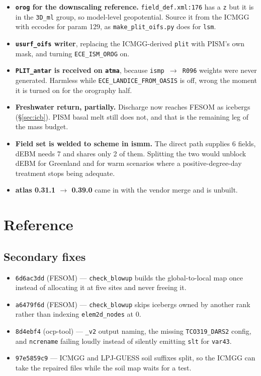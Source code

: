 \documentclass[11pt,a4paper]{article}
\newcommand{\code}[1]{\texttt{\small #1}}
\begin{document}
\begin{itemize}
      the snowpack is saturated at the 10\,m w.e.\ cap over 98.7\% of the ice sheet, so everything
      that accumulates is shed to the ocean, and the same water now also grows PISM. Must land
      together with the freshwater return, never before it.
\item \textbf{\code{orog} for the downscaling reference.} \code{field\_def.xml:176} has a \code{z}
      but it is in the \code{3D\_ml} group, so model-level geopotential. Source it from the ICMGG
      with eccodes for param 129, as \code{make\_plit\_oifs.py} does for \code{lsm}.
\item \textbf{\code{usurf\_oifs} writer}, replacing the ICMGG-derived \code{plit} with PISM's own
      mask, and turning \code{ECE\_ISM\_OROG} on.
\item \textbf{\code{PLIT\_antar} is received on \code{atma}}, because \code{ismp $\to$ R096}
      weights were never generated. Harmless while \code{ECE\_LANDICE\_FROM\_OASIS} is off, wrong
      the moment it is turned on for the orography half.
\item \textbf{Freshwater return, partially.} Discharge now reaches FESOM as icebergs
      (\S\ref{sec:icb}). PISM basal melt still does not, and that is the remaining leg of the mass
      budget.
\item \textbf{Field set is welded to scheme in ismm.} The direct path supplies 6 fields, dEBM needs
      7 and shares only 2 of them. Splitting the two would unblock dEBM for Greenland and for warm
      scenarios where a positive-degree-day treatment stops being adequate.
\item \textbf{atlas 0.31.1 $\to$ 0.39.0} came in with the vendor merge and is unbuilt.
\end{itemize}

\section{Reference}

\subsection{Secondary fixes}

\begin{itemize}
\item \code{6d6ac3dd} (FESOM) --- \code{check\_blowup} builds the global-to-local map once
instead of allocating it at five sites and never freeing it.
\item \code{a6479f6d} (FESOM) --- \code{check\_blowup} skips icebergs owned by another rank
rather than indexing \code{elem2d\_nodes} at 0.
\item \code{8d4ebf4} (ocp-tool) --- \code{\_v2} output naming, the missing \code{TCO319\_DARS2}
config, and \code{ncrename} failing loudly instead of silently emitting \code{slt} for
\code{var43}.
\item \code{97e5859c9} --- ICMGG and LPJ-GUESS soil suffixes split, so the ICMGG can take the
repaired files while the soil map waits for a test.
\end{itemize}
\end{document}
